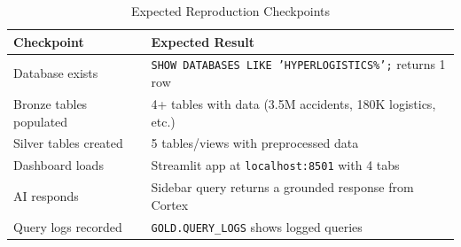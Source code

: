 \documentclass[14.5pt,letterpaper]{article}
\begin{document}
\begin{table}[H]
\centering
\caption{Expected Reproduction Checkpoints}
\begin{tabular}{@{}ll@{}}
\toprule
\textbf{Checkpoint} & \textbf{Expected Result} \\
\midrule
Database exists & \texttt{SHOW DATABASES LIKE 'HYPERLOGISTICS\%';} returns 1 row \\
Bronze tables populated & 4+ tables with data (3.5M accidents, 180K logistics, etc.) \\
Silver tables created & 5 tables/views with preprocessed data \\
Dashboard loads & Streamlit app at \texttt{localhost:8501} with 4 tabs \\
AI responds & Sidebar query returns a grounded response from Cortex \\
Query logs recorded & \texttt{GOLD.QUERY\_LOGS} shows logged queries \\
\bottomrule
\end{tabular}
\end{table}

\end{document}
